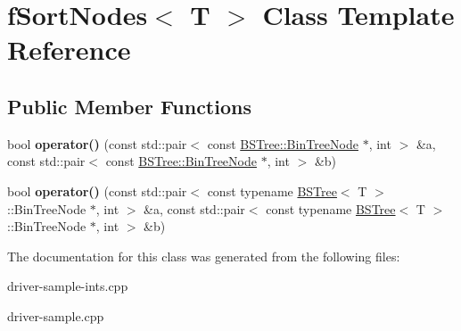 \hypertarget{classfSortNodes}{\section{f\-Sort\-Nodes$<$ T $>$ Class Template Reference}
\label{classfSortNodes}
}
\subsection*{Public Member Functions}
\begin{DoxyCompactItemize}
\item 
\hypertarget{classfSortNodes_a39189a0d1184e21907ddedf373ae311c}{bool {\bfseries operator()} (const std\-::pair$<$ const \hyperlink{structBSTree_1_1BinTreeNode}{B\-S\-Tree\-::\-Bin\-Tree\-Node} $\ast$, int $>$ \&a, const std\-::pair$<$ const \hyperlink{structBSTree_1_1BinTreeNode}{B\-S\-Tree\-::\-Bin\-Tree\-Node} $\ast$, int $>$ \&b)}\label{classfSortNodes_a39189a0d1184e21907ddedf373ae311c}

\item 
\hypertarget{classfSortNodes_aabe43f5713c21b4946ee97b0ea1d91e3}{bool {\bfseries operator()} (const std\-::pair$<$ const typename \hyperlink{classBSTree}{B\-S\-Tree}$<$ T $>$\-::Bin\-Tree\-Node $\ast$, int $>$ \&a, const std\-::pair$<$ const typename \hyperlink{classBSTree}{B\-S\-Tree}$<$ T $>$\-::Bin\-Tree\-Node $\ast$, int $>$ \&b)}\label{classfSortNodes_aabe43f5713c21b4946ee97b0ea1d91e3}

\end{DoxyCompactItemize}


The documentation for this class was generated from the following files\-:\begin{DoxyCompactItemize}
\item 
driver-\/sample-\/ints.\-cpp\item 
driver-\/sample.\-cpp\end{DoxyCompactItemize}
